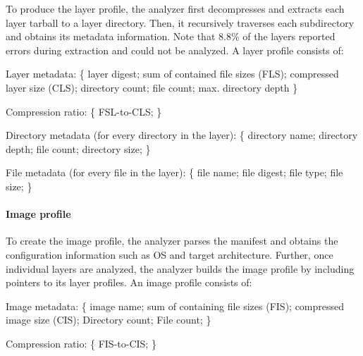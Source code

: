 %
To produce the layer profile, the analyzer first decompresses and extracts each
layer tarball to a layer directory.
%
Then, it recursively traverses each subdirectory and obtains
its metadata information. Note that 8.8\% of the layers reported errors during
extraction and could not be analyzed.
%
A layer profile consists of:
\begin{compactenumerate}
\item Layer metadata: \{
layer digest; 
sum of contained file sizes (FLS); 
compressed layer size (CLS); 
directory count;
file count;
max. directory depth
\}

\item Compression ratio: \{
FSL-to-CLS;
\}

\item Directory metadata (for every directory in the layer): \{
directory name;
directory depth;
file count;
directory size;
\}

\item File metadata (for every file in the layer): \{
file name;
file digest;
file type;
file size;
\}
\end{compactenumerate}


\paragraph{Image profile}

To create the image profile, the analyzer parses the manifest
and obtains the configuration information such as OS and target architecture.
Further, once individual layers are analyzed, the analyzer builds the image
profile by including pointers to its layer profiles. An image profile consists of:
\begin{compactenumerate}

\item Image metadata: \{
image name; 
sum of containing file sizes (FIS); 
compressed image size (CIS); 
Directory count;
File count;
\}

\item Compression ratio: \{
FIS-to-CIS;
\}

\end{compactenumerate}

